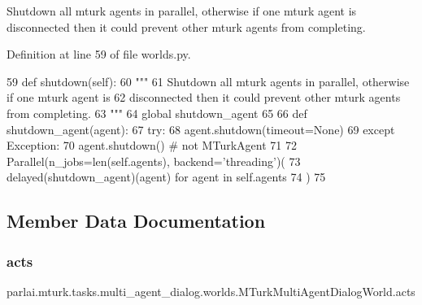 \begin{DoxyVerb}Shutdown all mturk agents in parallel, otherwise if one mturk agent is
disconnected then it could prevent other mturk agents from completing.
\end{DoxyVerb}
 

Definition at line 59 of file worlds.\+py.


\begin{DoxyCode}
59     \textcolor{keyword}{def }shutdown(self):
60         \textcolor{stringliteral}{"""}
61 \textcolor{stringliteral}{        Shutdown all mturk agents in parallel, otherwise if one mturk agent is}
62 \textcolor{stringliteral}{        disconnected then it could prevent other mturk agents from completing.}
63 \textcolor{stringliteral}{        """}
64         \textcolor{keyword}{global} shutdown\_agent
65 
66         \textcolor{keyword}{def }shutdown\_agent(agent):
67             \textcolor{keywordflow}{try}:
68                 agent.shutdown(timeout=\textcolor{keywordtype}{None})
69             \textcolor{keywordflow}{except} Exception:
70                 agent.shutdown()  \textcolor{comment}{# not MTurkAgent}
71 
72         Parallel(n\_jobs=len(self.agents), backend=\textcolor{stringliteral}{'threading'})(
73             delayed(shutdown\_agent)(agent) \textcolor{keywordflow}{for} agent \textcolor{keywordflow}{in} self.agents
74         )
75 \end{DoxyCode}


\subsection{Member Data Documentation}
\mbox{\label{classparlai_1_1mturk_1_1tasks_1_1multi__agent__dialog_1_1worlds_1_1MTurkMultiAgentDialogWorld_af92ab4ec8dc965e1b74dfc5904108983}} 
\subsubsection{\texorpdfstring{acts}{acts}}
{\footnotesize\ttfamily parlai.\+mturk.\+tasks.\+multi\+\_\+agent\+\_\+dialog.\+worlds.\+M\+Turk\+Multi\+Agent\+Dialog\+World.\+acts}



